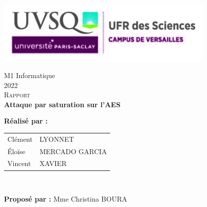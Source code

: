\includegraphics[width=0.8\textwidth]{images/logoUVSQ.jpg}

 \vspace{1.5\baselineskip}
 
\begin{center}
M1 Informatique \\
2022 \\
   \vspace{3\baselineskip}
\LARGE \textsc{Rapport} \normalsize \\
\vspace{6\baselineskip}
\Huge \textbf{Attaque par saturation sur l'AES} \normalsize \\
 \vspace{1\baselineskip}

 

\vspace{5\baselineskip}
\Large \textbf{ Réalisé par : } \normalsize 

\vspace{1\baselineskip}
\hspace{2\baselineskip}
\begin{tabular}{ll}
 Clément & LYONNET \\
 Éloïse & MERCADO GARCIA\\
 Vincent & XAVIER
 \end{tabular}\\
 \vspace{2\baselineskip}
 
 
\Large \textbf{Proposé par :} \hspace{1cm} \normalsize Mme Christina BOURA\\

 \end{center}